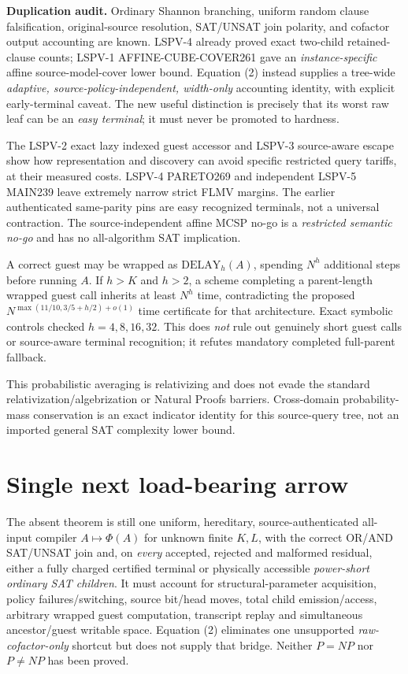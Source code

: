 \documentclass[11pt]{article}
\begin{document}
\noindent\textbf{Duplication audit.} Ordinary Shannon branching, uniform random clause falsification, original-source resolution, SAT/UNSAT join polarity, and cofactor output accounting are known. LSPV-4 already proved exact two-child retained-clause counts; LSPV-1 AFFINE-CUBE-COVER261 gave an \emph{instance-specific} affine source-model-cover lower bound. Equation (2) instead supplies a tree-wide \emph{adaptive, source-policy-independent, width-only} accounting identity, with explicit early-terminal caveat. The new useful distinction is precisely that its worst raw leaf can be an \emph{easy terminal}; it must never be promoted to hardness.

The LSPV-2 exact lazy indexed guest accessor and LSPV-3 source-aware escape show how representation and discovery can avoid specific restricted query tariffs, at their measured costs. LSPV-4 PARETO269 and independent LSPV-5 MAIN239 leave extremely narrow strict FLMV margins. The earlier authenticated same-parity pins are easy recognized terminals, not a universal contraction. The source-independent affine MCSP no-go is a \emph{restricted semantic no-go} and has no all-algorithm SAT implication.

A correct guest may be wrapped as $\mathrm{DELAY}_h(A)$, spending $N^h$ additional steps before running $A$. If $h>K$ and $h>2$, a scheme completing a parent-length wrapped guest call inherits at least $N^h$ time, contradicting the proposed $N^{\max(11/10,3/5+h/2)+o(1)}$ time certificate for that architecture. Exact symbolic controls checked $h=4,8,16,32$. This does \emph{not} rule out genuinely short guest calls or source-aware terminal recognition; it refutes mandatory completed full-parent fallback.

This probabilistic averaging is relativizing and does not evade the standard relativization/algebrization or Natural Proofs barriers. Cross-domain probability-mass conservation is an exact indicator identity for this source-query tree, not an imported general SAT complexity lower bound.

\section{Single next load-bearing arrow}
The absent theorem is still one uniform, hereditary, source-authenticated all-input compiler $A\mapsto\Phi(A)$ for unknown finite $K,L$, with the correct OR/AND SAT/UNSAT join and, on \emph{every} accepted, rejected and malformed residual, either a fully charged certified terminal or physically accessible \emph{power-short ordinary SAT children}. It must account for structural-parameter acquisition, policy failures/switching, source bit/head moves, total child emission/access, arbitrary wrapped guest computation, transcript replay and simultaneous ancestor/guest writable space. Equation (2) eliminates one unsupported \emph{raw-cofactor-only} shortcut but does not supply that bridge. Neither $P=NP$ nor $P\ne NP$ has been proved.
\end{document}
